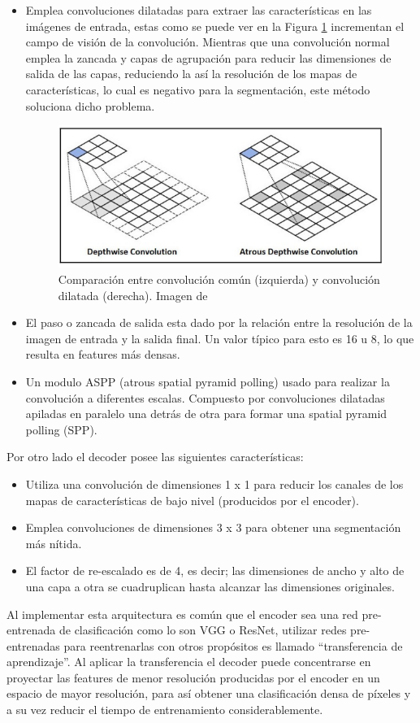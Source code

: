 \begin{itemize}
    \item Emplea convoluciones dilatadas para extraer las características en las imágenes de entrada, estas como se puede ver en la Figura \ref{dilated_convolution} incrementan el campo de visión de la convolución. Mientras que una convolución normal emplea la zancada y capas de agrupación para reducir las dimensiones de salida de las capas, reduciendo la así la resolución de los mapas de características, lo cual es negativo para la segmentación, este método soluciona dicho problema. 
    \begin{figure}[H]
        \centering
        \includegraphics[scale=0.6]{Recursos/atrous_convolution.png}
        \caption{Comparación entre convolución común (izquierda) y convolución dilatada (derecha). Imagen de \cite{Krishnendu}}
        \label{dilated_convolution}
    \end{figure}
    \item El paso o zancada de salida esta dado por la relación entre la resolución de la imagen de entrada y la salida final. Un valor típico para esto es 16 u 8, lo que resulta en features más densas.
    \item Un modulo ASPP (atrous spatial pyramid polling) usado para realizar la convolución a diferentes escalas. Compuesto por convoluciones dilatadas apiladas en paralelo una detrás de otra para formar una spatial pyramid polling (SPP).  
\end{itemize}
Por otro lado el decoder posee las siguientes características:
\begin{itemize}
    \item Utiliza una convolución de dimensiones 1 x 1 para reducir los canales de los mapas de características de bajo nivel (producidos por el encoder).
    \item Emplea convoluciones de dimensiones 3 x 3 para obtener una segmentación más nítida.
    \item El factor de re-escalado es de 4, es decir; las dimensiones de ancho y alto de una capa a otra se cuadruplican hasta alcanzar las dimensiones originales.
\end{itemize}
Al implementar esta arquitectura es común que el encoder sea una red pre-entrenada de clasificación como lo son VGG o ResNet, utilizar redes pre-entrenadas para reentrenarlas con otros propósitos es llamado ``transferencia de aprendizaje''. Al aplicar la transferencia el decoder puede concentrarse en proyectar las features de menor resolución producidas por el encoder en un espacio de mayor resolución, para así obtener una clasificación densa de píxeles y a su vez reducir el tiempo de entrenamiento considerablemente.